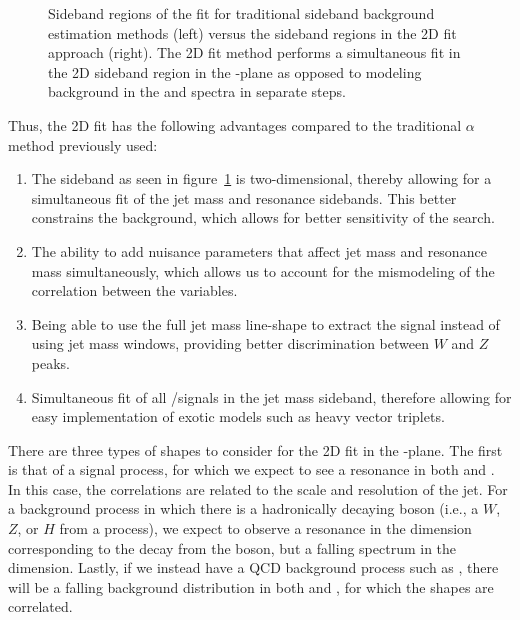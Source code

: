 \begin{figure}[htbp]
  \centering
  
  \caption{
    Sideband regions of the fit for traditional sideband background estimation methods (left) versus the sideband regions in the 2D fit approach (right).
    The 2D fit method performs a simultaneous fit in the 2D sideband region in the \MVV-\MJ plane as opposed to modeling background in the \MVV and \MJ spectra in separate steps.
  }
  \label{fig:2Dfit}
\end{figure}

Thus, the 2D fit has the following advantages compared to the traditional $\alpha$ method previously used:
\begin{enumerate}
  \item The sideband as seen in figure~\ref{fig:2Dfit} is two-dimensional, thereby allowing for a simultaneous fit of the jet mass and resonance sidebands.
  This better constrains the background, which allows for better sensitivity of the search.
  \item The ability to add nuisance parameters that affect jet mass and resonance mass simultaneously, which allows us to account for the mismodeling of the correlation between the variables.
  \item Being able to use the full jet mass line-shape to extract the signal instead of using jet mass windows, providing better discrimination between $W$ and $Z$ peaks.
  \item Simultaneous fit of all \WV/\WH signals in the jet mass sideband, therefore allowing for easy implementation of exotic models such as heavy vector triplets.
\end{enumerate}

There are three types of shapes to consider for the 2D fit in the \MVV-\MJ plane.
The first is that of a signal process, for which we expect to see a resonance in both \MVV and \MJ.
In this case, the correlations are related to the scale and resolution of the jet.
For a background process in which there is a hadronically decaying boson (i.e., a $W$, $Z$, or $H$ from a \WVt process), we expect to observe a resonance in the \MJ dimension corresponding to the decay from the boson, but a falling spectrum in the \MVV dimension.
Lastly, if we instead have a QCD background process such as \Wjets, there will be a falling background distribution in both \MVV and \MJ, for which the shapes are correlated.

